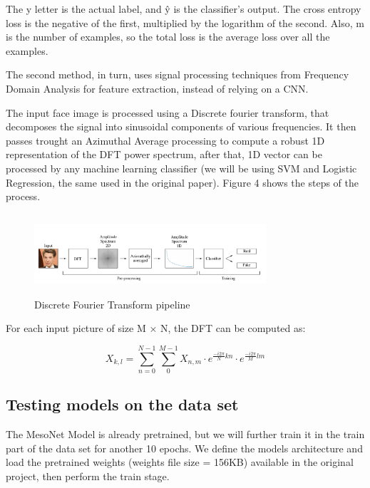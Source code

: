 \documentclass{bmvc2k}
\begin{document}
The y letter is the actual label, and ŷ is the classifier’s output. The cross entropy loss is the negative of the first, multiplied by the logarithm of the second. Also, m is the number of examples, so the total loss is the average loss over all the examples.

\hspace{1.5cm}

The second method, in turn, uses signal processing techniques from Frequency Domain Analysis for feature extraction, instead of relying on a CNN. 

The input face image is processed using a Discrete fourier transform, that decomposes the signal into sinusoidal components of various frequencies. It then passes trought an Azimuthal Average processing to compute a robust 1D representation of the DFT power spectrum, after that, 1D vector can be processed by any machine learning classifier (we will be using SVM and Logistic Regression, the same used in the original paper). Figure 4 shows the steps of the process.


\begin{figure}[!h]
\centering
\includegraphics[width=8.6cm, height=3.0cm]{fft-pipeline.png}
    \caption{Discrete Fourier Transform pipeline}
\end{figure}


For each input picture of size M × N, the DFT can be computed as:

\begin{equation}\label{eq:1}
  X_{k,l} = \sum_{n=0}^{N - 1} \sum_{0}^{M- 1} X_{n,m} \cdot e^{\frac{-i2\pi}{ N} kn} \cdot e^{\frac{-i2\pi}{ M} lm}
\end{equation}

\subsection{Testing models on the data set}

The MesoNet Model is already pretrained, but we will further train it in the train part of the data set for another 10 epochs. We define the models architecture and load the pretrained weights (weights file size = 156KB) available in the original project, then perform the train stage.
\end{document}
